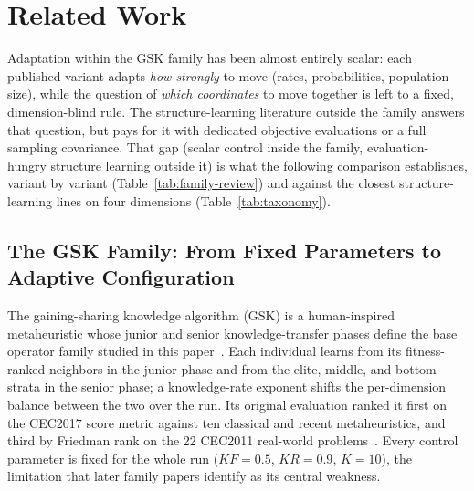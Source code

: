 \section{Related Work}\label{sec:related}\label{sec:literature}

Adaptation within the GSK family has been almost entirely scalar: each
published variant adapts \emph{how strongly} to move (rates,
probabilities, population size), while the question of \emph{which
coordinates} to move together is left to a fixed, dimension-blind rule.
The structure-learning literature outside the family answers that question,
but pays for it with dedicated objective evaluations or a full sampling
covariance. That gap (scalar control inside the family, evaluation-hungry
structure learning outside it) is what the following comparison
establishes, variant by variant (Table~\ref{tab:family-review}) and against
the closest structure-learning lines on four dimensions
(Table~\ref{tab:taxonomy}).

\subsection{The GSK Family: From Fixed Parameters to Adaptive Configuration}\label{sec:rel:family}

The gaining-sharing knowledge algorithm (GSK) is a human-inspired
metaheuristic whose junior and senior knowledge-transfer phases define
the base operator family studied in this
paper~\cite{mohamed2020gaining}. %
Each individual learns from its fitness-ranked neighbors in the junior
phase and from the elite, middle, and bottom strata in the senior phase;
a knowledge-rate exponent shifts the per-dimension balance between the
two over the run. Its original evaluation ranked it first on the CEC2017
score metric against ten classical and recent metaheuristics, and third
by Friedman rank on the 22 CEC2011 real-world
problems~\cite{mohamed2020gaining}. %
Every control parameter is fixed for the whole run
($KF = 0.5$, $KR = 0.9$, $K = 10$), the limitation that later
family papers identify as its central
weakness. %

